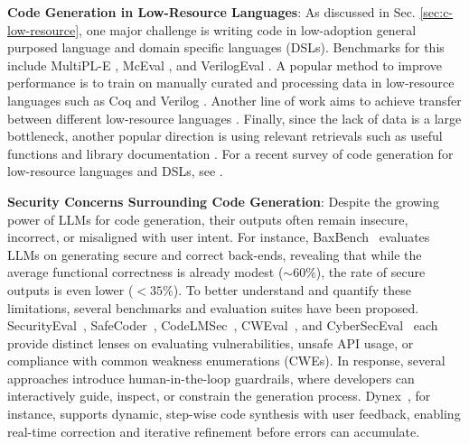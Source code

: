 \textbf{Code Generation in Low-Resource Languages}: As discussed in Sec. \ref{sec:c-low-resource}, one major challenge is writing code in low-adoption general purposed language and domain specific languages (DSLs). Benchmarks for this include MultiPL-E \citep{cassano2023multipl}, McEval \citep{chai2024mceval}, and VerilogEval \citep{liu2023verilogeval}. A popular method to improve performance is to train on manually curated and processing data in low-resource languages such as Coq \citep{florath2024enhancing} and Verilog \citep{pei2024betterv}. Another line of work aims to achieve transfer between different low-resource languages \citep{paul2024ircoder, cassano2024knowledge, orlanski2023measuring}. Finally, since the lack of data is a large bottleneck, another popular direction is using relevant retrievals such as useful functions and library documentation \citep{yang2023leandojo, zhou2022docprompting, yang2023leandojo}. For a recent survey of code generation for low-resource languages and DSLs, see \citep{joel2024survey}.

\textbf{Security Concerns Surrounding Code Generation}:
Despite the growing power of LLMs for code generation, their outputs often remain insecure, incorrect, or misaligned with user intent. 
For instance, BaxBench~\citep{vero2025baxbench} evaluates LLMs on generating secure and correct back-ends, revealing that while the average functional correctness is already modest ($\sim60\%$), the rate of secure outputs is even lower ($<35\%$).
To better understand and quantify these limitations, several benchmarks and evaluation suites have been proposed. 
SecurityEval~\citep{siddiq2022securityeval}, SafeCoder~\citep{he2024safecoder}, CodeLMSec~\citep{hajipour2023codelmsec}, CWEval~\citep{peng2025cweval}, and CyberSecEval~\citep{bhatt2023purplellamacybersecevalsecure, wan2024cyberseceval} each provide distinct lenses on evaluating vulnerabilities, unsafe API usage, or compliance with common weakness enumerations (CWEs). 
In response, several approaches introduce human-in-the-loop guardrails, where developers can interactively guide, inspect, or constrain the generation process. 
Dynex~\citep{ma2025dynexdynamiccodesynthesis}, for instance, supports dynamic, step-wise code synthesis with user feedback, enabling real-time correction and iterative refinement before errors can accumulate.


